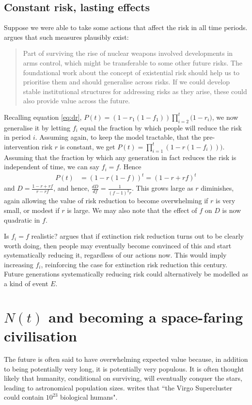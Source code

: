 \documentclass[british]{article}
\begin{document}
\subsection{Constant risk, lasting effects}\label{cr-le}
Suppose we were able to take some actions that affect the risk in all time periods. \cite{ord_modelling_????} argues that such measures plausibly exist:

\begin{quote}
Part of surviving the rise of nuclear weapons involved developments in arms control, which might be transferable to some other future risks. The foundational work about the concept of existential risk should help us to prioritise them and should generalise across risks. If we could develop stable institutional structures for addressing risks as they arise, these could also provide value across the future.
\end{quote}

Recalling equation \ref{eq:dr}, $P(t) =  (1-r_1(1-f_1)) \prod_{i=2}^t {(1-r_i})$, we now generalise it by letting $f_i$ equal the fraction by which people will reduce the risk in period $i$. Assuming again, to keep the model tractable, that the pre-intervention risk $r$ is constant, we get $P(t) = \prod_{i=1}^t {(1-r(1-f_i))})$. Assuming that the fraction by which any generation in fact reduces the risk is independent of time, we can say $f_i = f$. Hence
\begin{align*}
P(t) &= (1-r(1-f))^t = (1-r+rf)^t
\end{align*}
and $D= \frac{1-r+rf}{r-rf}$, and hence, $\frac{dD}{df}=\frac{1}{(f-1)^2r}$. This grows large as \(r\) diminishes, again allowing the value of risk reduction to become overwhelming if $r$ is very small, or modest if $r$ is large. We may also note that the effect of $f$ on $D$ is now quadratic in $f$.

Is $f_i = f$ realistic? \cite{ord_modelling_????} argues that if extinction risk reduction turns out to be clearly worth doing, then people may eventually become convinced of this and start systematically reducing it, regardless of our actions now. This would imply increasing $f_i$, reinforcing the case for extinction risk reduction this century. Future generations systematically reducing risk could alternatively be modelled as a kind of event $E$.

\section{$N(t)$ and becoming a space-faring civilisation}\label{nt}
The future is often said to have overwhelming expected value because, in
addition to being potentially very long, it is potentially very populous. It is often thought likely that humanity, conditional on surviving, will eventually conquer the stars, leading to astronomical population sizes. \cite{ba} writes that ``the Virgo Supercluster could contain $10^{23}$ biological humans".
\end{document}
